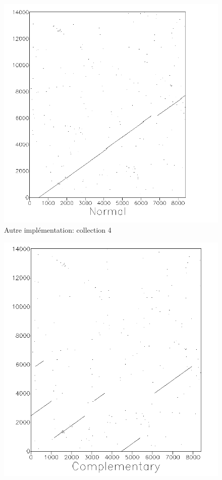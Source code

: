 \begin{figure}[!ht]
	\begin{minipage}[r]{.46\linewidth}
		\begin{center}
			\includegraphics[scale= 0.4]{../res/cible4-other.png}
			Autre implémentation: collection 4
		\end{center}
	\end{minipage} \hfill
	\begin{minipage}[c]{.46\linewidth}
		\begin{center}
		\includegraphics[scale= 0.4]{../res/cible4-ic-other.png}

\end{center}
\end{minipage}
\end{figure}
